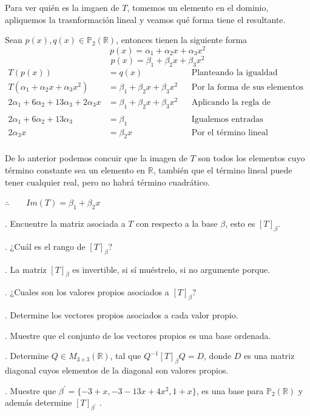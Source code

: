 \documentclass[letterpaper]{article}
\newcommand{\R}{\mathds{R}}
\newcommand{\Po}{\mathds{P}_2(\mathds{R})}
\renewcommand{\*}{\cdot}
\theoremstyle{definition}
\begin{document}
Para ver quién es la imgaen de $ T $, tomemos un elemento en el dominio, apliquemos la trasnformación lineal y veamos qué forma tiene el resultante.

Sean $ p(x), q(x) \in \Po $, entonces tienen la siguiente forma
\[ p(x) = \alpha_1 + \alpha_2x + \alpha_3x^2 \]
\[ p(x) = \beta_1 +  \beta_2x + \beta_3x^2 \]
\begin{align*}
	T(p(x)) &= q(x) && \text{Planteando la igualdad}\\
	T(\alpha_1 + \alpha_2x + \alpha_3x^2) &= \beta_1 +  \beta_2x + \beta_3x^2 && \text{Por la forma de sus elementos}\\
	2\alpha_1  + 6\alpha_2 + 13\alpha_3 + 2\alpha_3x&= \beta_1 +  \beta_2x + \beta_3x^2 && \text{Aplicando la regla de correspondencia }\\
	\\
	2\alpha_1  + 6\alpha_2 + 13\alpha_3 &= \beta_1 && \text{Igualemos entradas }\\
	2\alpha_3x&= \beta_2x && \text{Por el término lineal }\\
\end{align*}
\begin{center}
De lo anterior podemos concuir que la imagen de $ T $ son todos los elementos cuyo término constante sea un elemento en $ \R $, también que el término lineal puede tener cualquier real, pero no habrá término cuadrático.

	$ \therefore \qquad Im(T) = \beta_1 + \beta_2x$ 
\end{center}

. Encuentre la matriz asociada a $T$ con respecto a la base $\beta$, esto es $[T]_{\beta}$.

. ¿Cuál es el rango de $[T]_{\beta}$?

. La matriz $[T]_{\beta}$ es invertible, si sí muéstrelo, si no argumente porque.

. ¿Cuales son los valores propios asociados a $[T]_{\beta}$?

. Determine los vectores propios asociados a cada valor propio. 

. Muestre que el conjunto de los vectores propios es una base ordenada.

. Determine $Q \in M_{3\times 3}(\mathbb{R})$, tal que $Q^{-1}[T]_{\beta} Q = D$, donde $D$ es una matriz diagonal cuyos elementos de la diagonal son valores propios.

. Muestre que $\beta^{'} =\{ -3+x , -3-13x + 4x^2, 1+x \}$, es una base para $ \mathbb{P}_{2}(\mathbb{R})$ y además determine $[T]_{\beta^{'}}$ .
\end{document}
